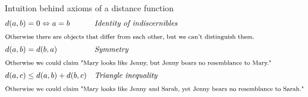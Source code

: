 \documentclass[dvipsnames]{beamer}
\begin{document}
\begin{frame}{Intuition behind axioms of a distance function}
\begin{align*}
		&d(a, b) = 0 \Leftrightarrow a = b  &&\text{\emph{Identity of indiscernibles}} \\
		\intertext{\footnotesize{Otherwise there are objects that differ from each other, but we can't distinguish them.}}
		&d(a, b) = d(b, a) &&\text{\emph{Symmetry}}\\
		\intertext{\footnotesize{Otherwise we could claim "Mary looks like Jenny, but Jenny bears no resemblance to Mary."}}
		&d(a, c) \leq d(a, b) + d(b,c) &&\text{\emph{Triangle inequality}}\\
		\intertext{\footnotesize{Otherwise we could claim "Mary looks like Jenny and Sarah, yet Jenny bears no resemblance to Sarah."}}
\end{align*}
\end{frame}
\end{document}
